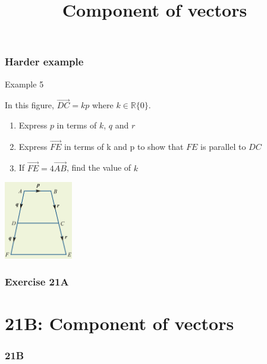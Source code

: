 \documentclass[
	11pt, %
]{beamer}
\newcommand{\blank}{\begin{frame}\end{frame}}
\begin{document}
\begin{frame}[t]
    \frametitle{Harder example}
    \begin{block}{Example 5}
        \begin{multicols}{2}
            In this figure, $\vec{DC} = kp$ where $k\in \mathbb{R} \{0\}$.\\
            \begin{enumerate}
                \item Express $p$ in terms of $k$, $q$ and $r$
                \item Express $\vec{FE}$ in terms of k and p to show that $FE$ is parallel to $DC$
                \item If $\vec{FE} = 4\vec{AB}$, find the value of $k$
            \end{enumerate}
            \columnbreak
            \includegraphics[width = 3cm]{Ex5.png}
        \end{multicols}
    \end{block}
\end{frame}
\blank

\begin{frame}
    \frametitle{Exercise 21A}
\end{frame}


\section{21B: Component of vectors}
\begin{frame}
    \frametitle{21B}
    \begin{center}
        \title{Component of vectors}
        \maketitle
    \end{center}
\end{frame}
\end{document}
